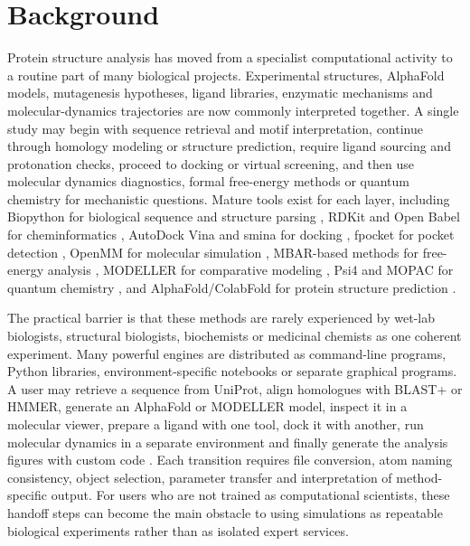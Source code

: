 \documentclass[pdflatex,sn-vancouver-num]{sn-jnl}
\begin{document}

\maketitle

\section{Background}\label{sec:background}

Protein structure analysis has moved from a specialist computational activity to a routine part of many biological projects.  Experimental structures, AlphaFold models, mutagenesis hypotheses, ligand libraries, enzymatic mechanisms and molecular-dynamics trajectories are now commonly interpreted together.  A single study may begin with sequence retrieval and motif interpretation, continue through homology modeling or structure prediction, require ligand sourcing and protonation checks, proceed to docking or virtual screening, and then use molecular dynamics diagnostics, formal free-energy methods or quantum chemistry for mechanistic questions.  Mature tools exist for each layer, including Biopython for biological sequence and structure parsing \cite{biopython2009}, RDKit and Open Babel for cheminformatics \cite{rdkit,openbabel2011}, AutoDock Vina and smina for docking \cite{vina2010,smina2013}, fpocket for pocket detection \cite{fpocket2009}, OpenMM for molecular simulation \cite{openmm2017}, MBAR-based methods for free-energy analysis \cite{mbar2008}, MODELLER for comparative modeling \cite{modeller1993}, Psi4 and MOPAC for quantum chemistry \cite{psi42020,mopac1990}, and AlphaFold/ColabFold for protein structure prediction \cite{alphafold2021,colabfold2022}.

The practical barrier is that these methods are rarely experienced by wet-lab biologists, structural biologists, biochemists or medicinal chemists as one coherent experiment.  Many powerful engines are distributed as command-line programs, Python libraries, environment-specific notebooks or separate graphical programs.  A user may retrieve a sequence from UniProt, align homologues with BLAST+ or HMMER, generate an AlphaFold or MODELLER model, inspect it in a molecular viewer, prepare a ligand with one tool, dock it with another, run molecular dynamics in a separate environment and finally generate the analysis figures with custom code \cite{uniprot2025,blastplus2009,hmmer2011,mafft2013,clustalo2011}.  Each transition requires file conversion, atom naming consistency, object selection, parameter transfer and interpretation of method-specific output.  For users who are not trained as computational scientists, these handoff steps can become the main obstacle to using simulations as repeatable biological experiments rather than as isolated expert services.
\end{document}
